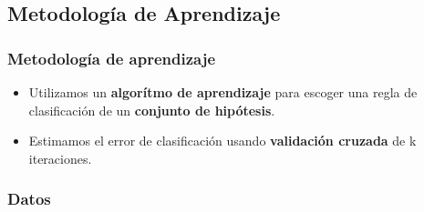\documentclass{beamer}
\begin{document}
\subsection{Metodología de Aprendizaje}
\begin{frame} %
  \frametitle{Metodología de aprendizaje}
  \begin{itemize}
  \item Utilizamos un \textbf{algorítmo de aprendizaje} para escoger una regla de clasificación de un \textbf{conjunto de hipótesis}.
  \item Estimamos el error de clasificación usando \textbf{validación cruzada} de k iteraciones.
  \end{itemize}
\end{frame}


\begin{frame}
\frametitle{Datos}


\end{frame}
\end{document}
